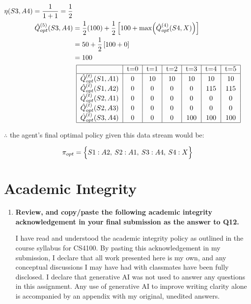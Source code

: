 \documentclass[a4paper]{article}
\begin{document}
\begin{sloppypar}
\begin{enumerate}[start=8,label=Q\arabic*,left=0pt]
\begin{align*}
        \eta(S3, A4) = \frac{1}{1 + 1} = \frac{1}{2} \\
        \hat{Q}^{(5)}_{opt}(S3, A4) &= \frac{1}{2}(100) + \frac{1}{2} \left[ 100 + \max \Bigl( \hat{Q}^{(4)}_{opt}(S4, X) \Bigr) \right] \\
        &= 50 + \frac{1}{2} \left[ 100 + 0 \right] \\
        &= 100 \\
        & \begin{array}{c}
            \begin{tabular}{|c|c|c|c|c|c|c|}
                \hline
                & t=0 & t=1 & t=2 & t=3 & t=4 & t=5 \\
                \hline
                $\hat{Q}^{(t)}_{opt}(S1, A1)$ & 0 & 10 & 10 & 10 & 10 & 10 \\ 
                $\hat{Q}^{(t)}_{opt}(S1, A2)$ & 0 & 0 & 0 & 0 & 115 & 115 \\ 
                $\hat{Q}^{(t)}_{opt}(S2, A1)$ & 0 & 0 & 0 & 0 & 0 & 0 \\ 
                $\hat{Q}^{(t)}_{opt}(S2, A3)$ & 0 & 0 & 0 & 0 & 0 & 0 \\ 
                $\hat{Q}^{(t)}_{opt}(S3, A4)$ & 0 & 0 & 0 & 100 & 100 & 100 \\ 
                \hline
            \end{tabular}
        \end{array}
    \end{align*}

    \noindent $\therefore$ the agent's final optimal policy given this data stream would be:

    \[ \pi_{opt} = \Bigl\{ S1: A2, \: S2: A1, \: S3: A4, \: S4: X \Bigl\} \]
    
\end{enumerate}

\section{Academic Integrity}

\begin{enumerate}[start=12,label=Q\arabic*,left=0pt]
    \item \textbf{Review, and copy/paste the following academic integrity acknowledgement in your final submission as the answer to Q12.}
    
    \par I have read and understood the academic integrity policy as outlined in the course syllabus for CS4100. 
    By pasting this acknowledgement in my submission, I declare that all work presented here is my own, and any conceptual 
    discussions I may have had with classmates have been fully disclosed. I declare that generative AI was not used to answer
    any questions in this assignment. Any use of generative AI to improve writing clarity alone is accompanied by an appendix 
    with my original, unedited answers.

\end{enumerate}

\end{sloppypar}



\end{document}
